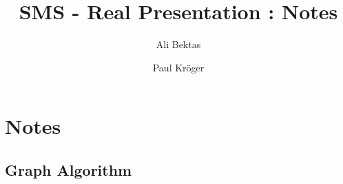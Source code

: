 \documentclass{article}
\author{Ali Bektas \and Paul Kröger}
\title{SMS - Real Presentation : Notes}
\begin{document}
	\maketitle

	\section*{Notes}
	\subsection*{Graph Algorithm}
	
\end{document}
